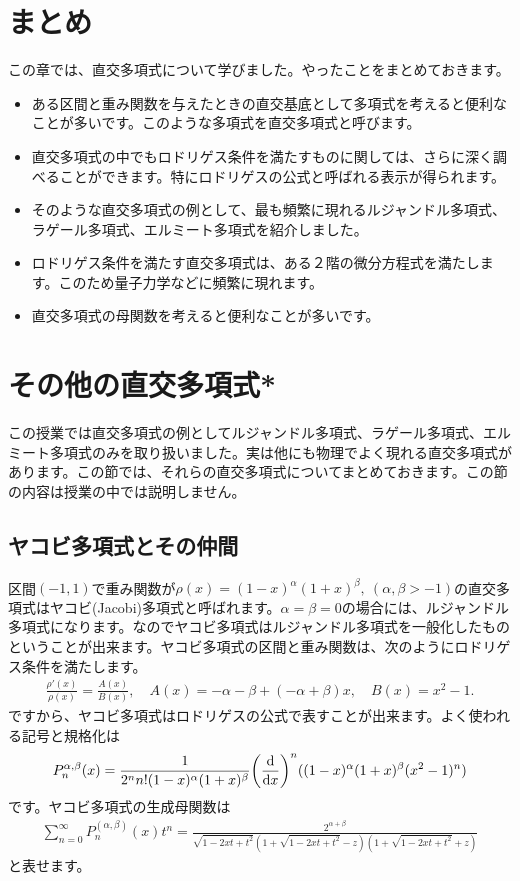 \documentclass[report,paper=a4, fontsize=12pt, line_length=16cm, number_of_lines=33,dvipdfmx]{jlreq}
\numberwithin{equation}{section}
\begin{document}
\section{まとめ}
この章では、直交多項式について学びました。やったことをまとめておきます。
\begin{itemize}
  \item ある区間と重み関数を与えたときの直交基底として多項式を考えると便利なことが多いです。このような多項式を直交多項式と呼びます。
  \item 直交多項式の中でもロドリゲス条件を満たすものに関しては、さらに深く調べることができます。特にロドリゲスの公式と呼ばれる表示が得られます。
  \item そのような直交多項式の例として、最も頻繁に現れるルジャンドル多項式、ラゲール多項式、エルミート多項式を紹介しました。
  \item ロドリゲス条件を満たす直交多項式は、ある２階の微分方程式を満たします。このため量子力学などに頻繁に現れます。
  \item 直交多項式の母関数を考えると便利なことが多いです。
\end{itemize}


\section{その他の直交多項式*}
この授業では直交多項式の例としてルジャンドル多項式、ラゲール多項式、エルミート多項式のみを取り扱いました。実は他にも物理でよく現れる直交多項式があります。この節では、それらの直交多項式についてまとめておきます。この節の内容は授業の中では説明しません。

\subsection{ヤコビ多項式とその仲間}
区間$(-1,1)$で重み関数が$\rho(x)=(1-x)^{\alpha}(1+x)^{\beta},\ (\alpha,\beta >-1)$の直交多項式はヤコビ(Jacobi)多項式と呼ばれます。$\alpha=\beta=0$の場合には、ルジャンドル多項式になります。なのでヤコビ多項式はルジャンドル多項式を一般化したものということが出来ます。ヤコビ多項式の区間と重み関数は、次のようにロドリゲス条件を満たします。
\begin{align}
  \frac{\rho'(x)}{\rho(x)}=\frac{A(x)}{B(x)},\quad A(x)=-\alpha-\beta+(-\alpha+\beta)x,\quad B(x)=x^2-1.
\end{align}
ですから、ヤコビ多項式はロドリゲスの公式で表すことが出来ます。よく使われる記号と規格化は
\begin{align}
  P^{\alpha,\beta}_n(x)=\frac{1}{2^n n!(1-x)^{\alpha}(1+x)^{\beta}}\qty(\dv{x})^n((1-x)^{\alpha}(1+x)^{\beta}(x^2-1)^n)
\end{align}
です。ヤコビ多項式の生成母関数は
\begin{align}
  \sum_{n=0}^{\infty}P_{n}^{(\alpha,\beta)}(x)t^n=
  \frac{2^{\alpha+\beta}}{\sqrt{1-2xt+t^2}(1+\sqrt{1-2xt+t^2}-z)(1+\sqrt{1-2xt+t^2}+z)}
\end{align}
と表せます。
\end{document}
